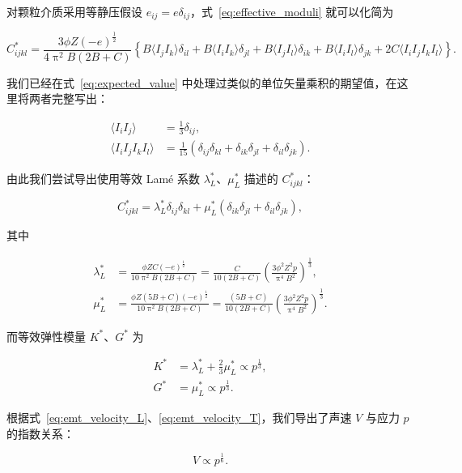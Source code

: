 对颗粒介质采用等静压假设 $e_{ij} = e\delta_{ij}$，式~\eqref{eq:effective_moduli} 就可以化简为

\begin{equation}
  C_{ijkl}^{*} = \frac{3\phi Z(-e)^{\frac{1}{2}}}{4\uppi^{2}B(2B+C)}\left\{B\langle I_{j}I_{k}\rangle\delta_{il} + B\langle I_{i}I_{k}\rangle\delta_{jl} + B\langle I_{j}I_{l}\rangle\delta_{ik} + B\langle I_{i}I_{l}\rangle\delta_{jk} + 2C\langle I_{i}I_{j}I_{k}I_{l}\rangle\right\}.
\end{equation}

我们已经在式~\eqref{eq:expected_value} 中处理过类似的单位矢量乘积的期望值，在这里将两者完整写出：

\begin{align}
  \langle I_{i}I_{j}\rangle &= \frac{1}{3}\delta_{ij},\\
  \langle I_{i}I_{j}I_{k}I_{l}\rangle &= \frac{1}{15}\left(\delta_{ij}\delta_{kl} + \delta_{ik}\delta_{jl} + \delta_{il}\delta_{jk}\right).
\end{align}

由此我们尝试导出使用等效 Lamé 系数 $\lambda_{L}^{*}$、$\mu_{L}^{*}$ 描述的 $C_{ijkl}^{*}$：

\begin{equation}
  C_{ijkl}^{*} = \lambda_{L}^{*}\delta_{ij}\delta_{kl} + \mu_{L}^{*}(\delta_{ik}\delta_{jl} + \delta_{il}\delta_{jk}),
\end{equation}

其中

\begin{align}
  \lambda_{L}^{*} &= \frac{\phi ZC(-e)^{\frac{1}{2}}}{10\uppi^{2}B(2B+C)} = \frac{C}{10(2B+C)}\left(\frac{3\phi^{2}Z^{2}p}{\uppi^{4}B^{2}}\right)^{\frac{1}{3}},\\
  \mu_{L}^{*} &= \frac{\phi Z(5B+C)(-e)^{\frac{1}{2}}}{10\uppi^{2}B(2B+C)} =\frac{(5B+C)}{10(2B+C)}\left(\frac{3\phi^{2}Z^{2}p}{\uppi^{4}B^{2}}\right)^{\frac{1}{3}}.
\end{align}

而等效弹性模量 $K^{*}$、$G^{*}$ 为

\begin{align}
  K^{*} &= \lambda_{L}^{*} + \frac{2}{3}\mu_{L}^{*}\propto p^{\frac{1}{3}},\\
  G^{*} &= \mu_{L}^{*} \propto p^{\frac{1}{3}}.
\end{align}

根据式~\eqref{eq:emt_velocity_L}、\eqref{eq:emt_velocity_T}，我们导出了声速 $V$ 与应力 $p$ 的指数关系：

\begin{equation}
  V\propto p^{\frac{1}{6}}.
\end{equation}

